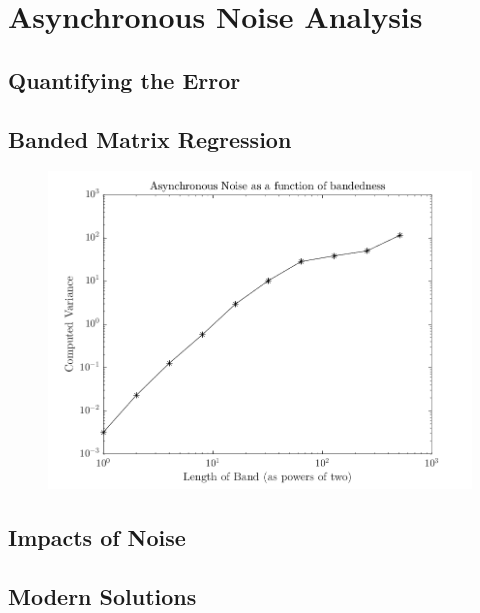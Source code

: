 \section{Asynchronous Noise Analysis}\label{sec:asyncnoise}

\subsection{Quantifying the Error}

\subsection{Banded Matrix Regression}
\begin{figure}[!htb]
  \centering
  \includegraphics[width=.8\textwidth]{./resources/banded_asyncnoise}
\end{figure}

\subsection{Impacts of Noise}

\subsection{Modern Solutions}
